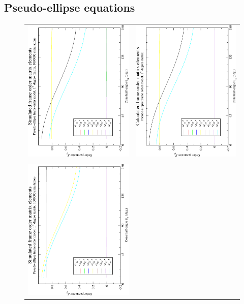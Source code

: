 
\subsection{Pseudo-ellipse equations}

\begin{figure}
\centering
  \begin{tabular}{@{}cc@{}}
    \includegraphics[width=.35\textwidth,angle=270]{images/frame_order_matrix/Sij_pseudo-ellipse_in_frame_theta_x_ens1000000.eps} &
    \includegraphics[width=.35\textwidth,angle=270]{images/frame_order_matrix/Sij_pseudo-ellipse_in_frame_theta_x_calc.eps} \\
    \\[-5pt]
    \includegraphics[width=.35\textwidth,angle=270]{images/frame_order_matrix/Sij_pseudo-ellipse_in_frame_theta_y_ens1000000.eps} &

\end{tabular}
\end{figure}
